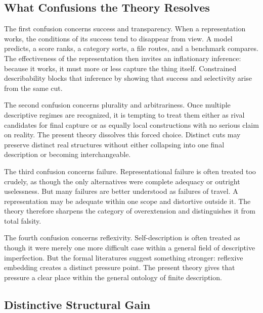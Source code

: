 \documentclass[11pt]{article}
\begin{document}
\subsection{What Confusions the Theory Resolves}

The first confusion concerns success and transparency. When a representation works, the conditions of its success tend to disappear from view. A model predicts, a score ranks, a category sorts, a file routes, and a benchmark compares. The effectiveness of the representation then invites an inflationary inference: because it works, it must more or less capture the thing itself. Constrained describability blocks that inference by showing that success and selectivity arise from the same cut. \cite{frigg_hartmann_models_sep,frigg_nguyen_scientific_representation_sep}

The second confusion concerns plurality and arbitrariness. Once multiple descriptive regimes are recognized, it is tempting to treat them either as rival candidates for final capture or as equally local constructions with no serious claim on reality. The present theory dissolves this forced choice. Distinct cuts may preserve distinct real structures without either collapsing into one final description or becoming interchangeable. \cite{chakravartty_scientific_realism_sep,ladyman_structural_realism_sep,scientific_pluralism_sep}

The third confusion concerns failure. Representational failure is often treated too crudely, as though the only alternatives were complete adequacy or outright uselessness. But many failures are better understood as failures of travel. A representation may be adequate within one scope and distortive outside it. The theory therefore sharpens the category of overextension and distinguishes it from total falsity. \cite{mitchell_model_cards,gebru_datasheets,nist_explainable_ai}

The fourth confusion concerns reflexivity. Self-description is often treated as though it were merely one more difficult case within a general field of descriptive imperfection. But the formal literatures suggest something stronger: reflexive embedding creates a distinct pressure point. The present theory gives that pressure a clear place within the general ontology of finite description. \cite{bolander_self_reference_sep}

\subsection{Distinctive Structural Gain}
\end{document}

